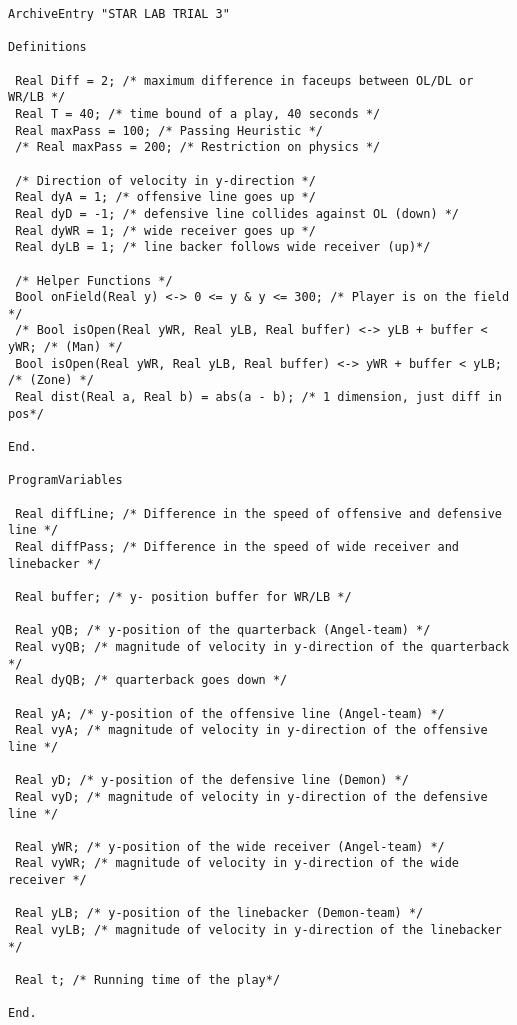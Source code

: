 \begin{lstlisting}
ArchiveEntry "STAR LAB TRIAL 3"

Definitions

 Real Diff = 2; /* maximum difference in faceups between OL/DL or WR/LB */
 Real T = 40; /* time bound of a play, 40 seconds */
 Real maxPass = 100; /* Passing Heuristic */
 /* Real maxPass = 200; /* Restriction on physics */

 /* Direction of velocity in y-direction */
 Real dyA = 1; /* offensive line goes up */
 Real dyD = -1; /* defensive line collides against OL (down) */
 Real dyWR = 1; /* wide receiver goes up */
 Real dyLB = 1; /* line backer follows wide receiver (up)*/

 /* Helper Functions */
 Bool onField(Real y) <-> 0 <= y & y <= 300; /* Player is on the field */
 /* Bool isOpen(Real yWR, Real yLB, Real buffer) <-> yLB + buffer < yWR; /* (Man) */
 Bool isOpen(Real yWR, Real yLB, Real buffer) <-> yWR + buffer < yLB; /* (Zone) */
 Real dist(Real a, Real b) = abs(a - b); /* 1 dimension, just diff in pos*/

End.

ProgramVariables

 Real diffLine; /* Difference in the speed of offensive and defensive line */
 Real diffPass; /* Difference in the speed of wide receiver and linebacker */

 Real buffer; /* y- position buffer for WR/LB */

 Real yQB; /* y-position of the quarterback (Angel-team) */
 Real vyQB; /* magnitude of velocity in y-direction of the quarterback */
 Real dyQB; /* quarterback goes down */

 Real yA; /* y-position of the offensive line (Angel-team) */
 Real vyA; /* magnitude of velocity in y-direction of the offensive line */

 Real yD; /* y-position of the defensive line (Demon) */
 Real vyD; /* magnitude of velocity in y-direction of the defensive line */

 Real yWR; /* y-position of the wide receiver (Angel-team) */
 Real vyWR; /* magnitude of velocity in y-direction of the wide receiver */

 Real yLB; /* y-position of the linebacker (Demon-team) */
 Real vyLB; /* magnitude of velocity in y-direction of the linebacker */

 Real t; /* Running time of the play*/

End.


\end{lstlisting}
